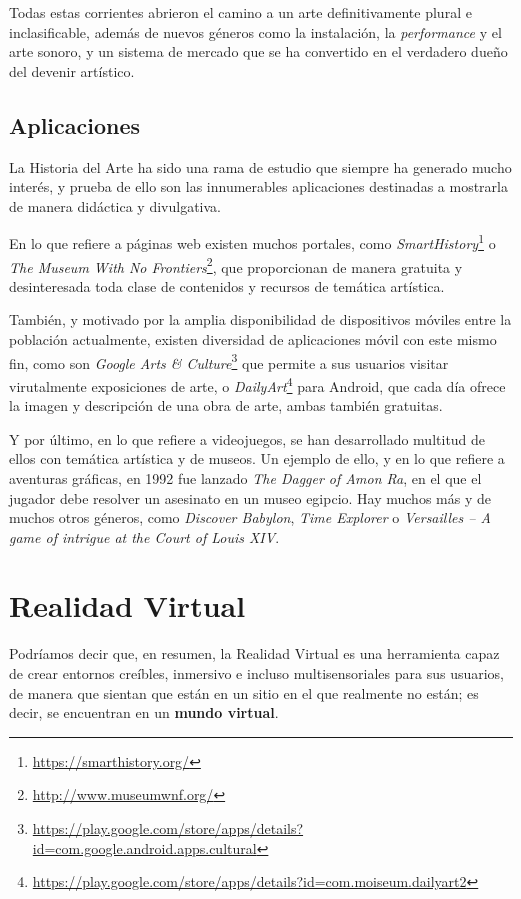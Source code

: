 Todas estas corrientes abrieron el camino a un arte definitivamente plural e inclasificable, además de nuevos géneros como la instalación, la \textit{performance} y el arte sonoro, y un sistema de mercado que se ha convertido en el verdadero dueño del devenir artístico.

\subsection{Aplicaciones}

La Historia del Arte ha sido una rama de estudio que siempre ha generado mucho interés, y prueba de ello son las innumerables aplicaciones destinadas a mostrarla de manera didáctica y divulgativa.

En lo que refiere a páginas web existen muchos portales, como \textit{SmartHistory}\footnote{\url{https://smarthistory.org/}} o \textit{The Museum With No Frontiers}\footnote{\url{http://www.museumwnf.org/}}, que proporcionan de manera gratuita y desinteresada toda clase de contenidos y recursos de temática artística.

También, y motivado por la amplia disponibilidad de dispositivos móviles entre la población actualmente, existen diversidad de aplicaciones móvil con este mismo fin, como son \textit{Google Arts \& Culture}\footnote{\url{https://play.google.com/store/apps/details?id=com.google.android.apps.cultural}} que permite a sus usuarios visitar virutalmente exposiciones de arte, o \textit{DailyArt}\footnote{\url{https://play.google.com/store/apps/details?id=com.moiseum.dailyart2}} para Android, que cada día ofrece la imagen y descripción de una obra de arte, ambas también gratuitas.

Y por último, en lo que refiere a videojuegos, se han desarrollado multitud de ellos con temática artística y de museos. Un ejemplo de ello, y en lo que refiere a aventuras gráficas, en 1992 fue lanzado \textit{The Dagger of Amon Ra}, en el que el jugador debe resolver un asesinato en un museo egipcio. Hay muchos más y de muchos otros géneros, como \textit{Discover Babylon}, \textit{Time Explorer} o \textit{Versailles – A game of intrigue at the Court of Louis XIV}.

\section{Realidad Virtual}

Podríamos decir que, en resumen, la Realidad Virtual es una herramienta capaz de crear entornos creíbles, inmersivo e incluso multisensoriales para sus usuarios, de manera que sientan que están en un sitio en el que realmente no están; es decir, se encuentran en un \textbf{mundo virtual}.

